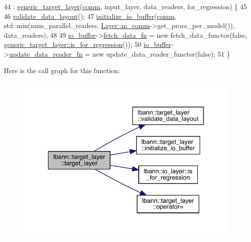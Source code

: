 \begin{DoxyCode}
44     : \hyperlink{classlbann_1_1generic__target__layer_a9b82afdbd6bb2671b0fde30c0116ada5}{generic\_target\_layer}(\hyperlink{file__io_8cpp_ab048c6f9fcbcfaa57ce68b00263dbebe}{comm}, input\_layer,  data\_readers, for\_regression) \{
45 
46     \hyperlink{classlbann_1_1target__layer_a34b7fe0522350d9fef731ae0642a8931}{validate\_data\_layout}();
47     \hyperlink{classlbann_1_1target__layer_a566c3d94992d4cbc4f17b4084664cc34}{initialize\_io\_buffer}(\hyperlink{file__io_8cpp_ab048c6f9fcbcfaa57ce68b00263dbebe}{comm}, std::min(num\_parallel\_readers, 
      \hyperlink{classlbann_1_1Layer_a5de05c52f22e0bbd7c703bec3ad4dbf2}{Layer::m\_comm}->get\_procs\_per\_model()), data\_readers);
48 
49     \hyperlink{classlbann_1_1generic__target__layer_a8da650b94f50cc63fc90cd792fa50c3f}{io\_buffer}->\hyperlink{classlbann_1_1generic__io__buffer_a267170b4fd11dc60c782a9cb2b7b06cc}{fetch\_data\_fn} = \textcolor{keyword}{new} fetch\_data\_functor(\textcolor{keyword}{false}, 
      \hyperlink{classlbann_1_1io__layer_a61f2e00334c820235795154492876476}{generic\_target\_layer::is\_for\_regression}());
50     \hyperlink{classlbann_1_1generic__target__layer_a8da650b94f50cc63fc90cd792fa50c3f}{io\_buffer}->\hyperlink{classlbann_1_1generic__io__buffer_a031eda7559a9e241afb3958b56088560}{update\_data\_reader\_fn} = \textcolor{keyword}{new} update\_data\_reader\_functor(\textcolor{keyword}{false});
51   \}
\end{DoxyCode}
Here is the call graph for this function\+:\nopagebreak
\begin{figure}[H]
\begin{center}
\leavevmode
\includegraphics[width=328pt]{classlbann_1_1target__layer_ab06729051345c739c33ea445ceed100a_cgraph}
\end{center}
\end{figure}
